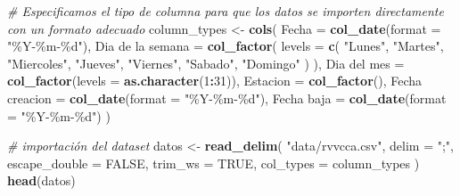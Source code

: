 \documentclass[notspecified,article,submit,moreauthors,pdftex]{Definitions/mdpi}
\newenvironment{Shaded}{\begin{snugshade}}{\end{snugshade}}
\newcommand{\AttributeTok}[1]{\textcolor[rgb]{0.13,0.29,0.53}{#1}}
\newcommand{\CommentTok}[1]{\textcolor[rgb]{0.56,0.35,0.01}{\textit{#1}}}
\newcommand{\ConstantTok}[1]{\textcolor[rgb]{0.56,0.35,0.01}{#1}}
\newcommand{\DecValTok}[1]{\textcolor[rgb]{0.00,0.00,0.81}{#1}}
\newcommand{\FunctionTok}[1]{\textcolor[rgb]{0.13,0.29,0.53}{\textbf{#1}}}
\newcommand{\NormalTok}[1]{#1}
\newcommand{\OtherTok}[1]{\textcolor[rgb]{0.56,0.35,0.01}{#1}}
\newcommand{\SpecialCharTok}[1]{\textcolor[rgb]{0.81,0.36,0.00}{\textbf{#1}}}
\newcommand{\StringTok}[1]{\textcolor[rgb]{0.31,0.60,0.02}{#1}}
\begin{document}
\begin{Shaded}
\begin{Highlighting}[]
\CommentTok{\# Especificamos el tipo de columna para que los datos se importen directamente con un formato adecuado}
\NormalTok{column\_types }\OtherTok{\textless{}{-}} \FunctionTok{cols}\NormalTok{(}
  \AttributeTok{Fecha =} \FunctionTok{col\_date}\NormalTok{(}\AttributeTok{format =} \StringTok{"\%Y{-}\%m{-}\%d"}\NormalTok{),}
  \StringTok{\textasciigrave{}}\AttributeTok{Dia de la semana}\StringTok{\textasciigrave{}} \OtherTok{=} \FunctionTok{col\_factor}\NormalTok{(}
    \AttributeTok{levels =} \FunctionTok{c}\NormalTok{(}
      \StringTok{"Lunes"}\NormalTok{,}
      \StringTok{"Martes"}\NormalTok{,}
      \StringTok{"Miercoles"}\NormalTok{,}
      \StringTok{"Jueves"}\NormalTok{,}
      \StringTok{"Viernes"}\NormalTok{,}
      \StringTok{"Sabado"}\NormalTok{,}
      \StringTok{"Domingo"}
\NormalTok{    )}
\NormalTok{  ),}
  \StringTok{\textasciigrave{}}\AttributeTok{Dia del mes}\StringTok{\textasciigrave{}} \OtherTok{=} \FunctionTok{col\_factor}\NormalTok{(}\AttributeTok{levels =} \FunctionTok{as.character}\NormalTok{(}\DecValTok{1}\SpecialCharTok{:}\DecValTok{31}\NormalTok{)),}
  \AttributeTok{Estacion =} \FunctionTok{col\_factor}\NormalTok{(),}
  \StringTok{\textasciigrave{}}\AttributeTok{Fecha creacion}\StringTok{\textasciigrave{}} \OtherTok{=} \FunctionTok{col\_date}\NormalTok{(}\AttributeTok{format =} \StringTok{"\%Y{-}\%m{-}\%d"}\NormalTok{),}
  \StringTok{\textasciigrave{}}\AttributeTok{Fecha baja}\StringTok{\textasciigrave{}} \OtherTok{=} \FunctionTok{col\_date}\NormalTok{(}\AttributeTok{format =} \StringTok{"\%Y{-}\%m{-}\%d"}\NormalTok{)}
\NormalTok{)}

\CommentTok{\# importación del dataset}
\NormalTok{datos }\OtherTok{\textless{}{-}}
  \FunctionTok{read\_delim}\NormalTok{(}
    \StringTok{"data/rvvcca.csv"}\NormalTok{,}
    \AttributeTok{delim =} \StringTok{";"}\NormalTok{,}
    \AttributeTok{escape\_double =} \ConstantTok{FALSE}\NormalTok{,}
    \AttributeTok{trim\_ws =} \ConstantTok{TRUE}\NormalTok{,}
    \AttributeTok{col\_types =}\NormalTok{ column\_types}
\NormalTok{  )}
\FunctionTok{head}\NormalTok{(datos)}
\end{Highlighting}
\end{Shaded}
\end{document}
